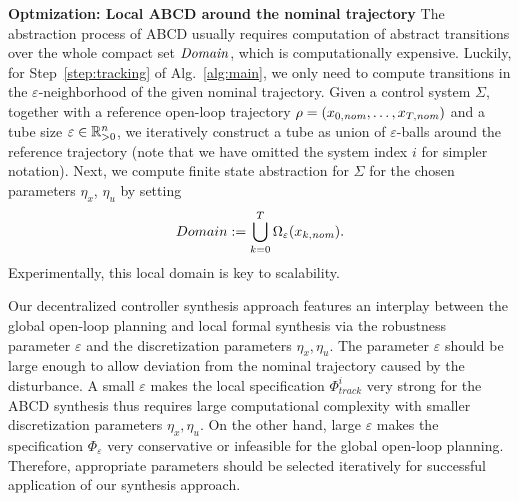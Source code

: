 \smallskip
\noindent\textbf{Optmization: Local ABCD around the nominal trajectory}\hfill
%
The abstraction process of ABCD usually requires computation of abstract transitions over the whole compact set $\mathit{Domain}$, which is computationally expensive.
Luckily, for Step~\ref{step:tracking} of Alg.~\ref{alg:main}, we only need to compute transitions in the $\varepsilon$-neighborhood of the given nominal trajectory.
Given a control system $\Sigma$, together with a reference open-loop trajectory $\rho=(x_{0,\mathit{nom}},\ldots,x_{T,\mathit{nom}})$ and a tube size $\varepsilon\in \mathbb{R}_{>0}^n$, we iteratively construct a tube as union of $\varepsilon$-balls around the reference trajectory (note that we have omitted  the system index $i$ for simpler notation).
Next, we compute finite state abstraction for $\Sigma$ for the chosen parameters $\eta_x$, $\eta_u$ by setting
\begin{equation*}
Domain:=\bigcup_{k=0}^T\Omega_{\varepsilon}(x_{k,\mathit{nom}}).
\end{equation*}
%
Experimentally, this local domain is key to scalability.
\begin{remark}
Our decentralized controller synthesis approach features an interplay between the global open-loop planning and local formal synthesis via the robustness parameter $\varepsilon$ and the discretization parameters $\eta_x,\eta_u$.  The parameter $\varepsilon$ should be large enough to allow deviation from the nominal trajectory caused by the disturbance. A small $\varepsilon$ makes the local specification $\Phi^i_{track}$ very strong for the ABCD synthesis thus requires large computational complexity with smaller discretization parameters $\eta_x,\eta_u$. On the other hand, large $\varepsilon$ makes the specification $\Phi_\varepsilon$ very conservative or infeasible for the global open-loop planning. Therefore, appropriate parameters should be selected iteratively for successful application of our synthesis approach. 
\end{remark}
% 


